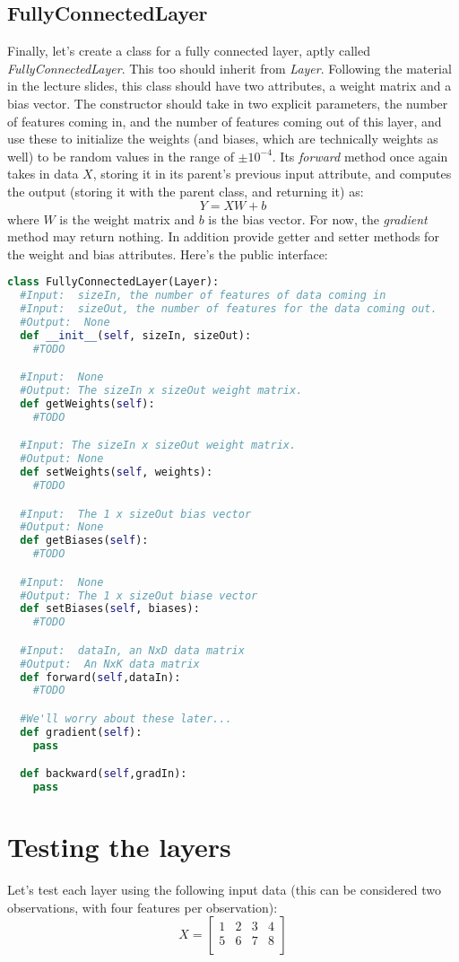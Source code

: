 \documentclass[12pt]{article}
\begin{document}
\subsection*{FullyConnectedLayer}
Finally, let's create a class for a fully connected layer, aptly called \emph{FullyConnectedLayer}.  This too should inherit from \emph{Layer}.  Following the material in the lecture slides, this class should have two attributes, a weight matrix and a bias vector.  The constructor should take in two explicit parameters, the number of features coming in, and the number of features coming out of this layer, and use these to initialize the weights (and biases, which are technically weights as well) to be random values in the range of $\pm 10^{-4}$.   Its \emph{forward} method once again takes in data $X$, storing it in its parent's previous input attribute, and computes the output (storing it with the parent class, and returning it) as:
$$Y = XW+b$$
where $W$ is the weight matrix and $b$ is the bias vector.  For now, the \emph{gradient} method may return nothing.  In addition provide getter and setter methods for the weight and bias attributes.  Here's the public interface:

\begin{lstlisting}[language=Python]
class FullyConnectedLayer(Layer):
  #Input:  sizeIn, the number of features of data coming in
  #Input:  sizeOut, the number of features for the data coming out.
  #Output:  None
  def __init__(self, sizeIn, sizeOut):
    #TODO

  #Input:  None
  #Output: The sizeIn x sizeOut weight matrix.
  def getWeights(self):
    #TODO

  #Input: The sizeIn x sizeOut weight matrix.
  #Output: None
  def setWeights(self, weights):
    #TODO

  #Input:  The 1 x sizeOut bias vector
  #Output: None
  def getBiases(self):
    #TODO

  #Input:  None
  #Output: The 1 x sizeOut biase vector
  def setBiases(self, biases):
    #TODO

  #Input:  dataIn, an NxD data matrix
  #Output:  An NxK data matrix
  def forward(self,dataIn):
    #TODO

  #We'll worry about these later...
  def gradient(self):
    pass

  def backward(self,gradIn):
    pass

\end{lstlisting}


\newpage
\section{Testing the layers}
Let's test each layer using the following input data (this can be considered two observations, with four features per observation):
$$X = \begin{bmatrix}
1 & 2 & 3 & 4\\
5 & 6 & 7 & 8\\
\end{bmatrix}$$
\end{document}

